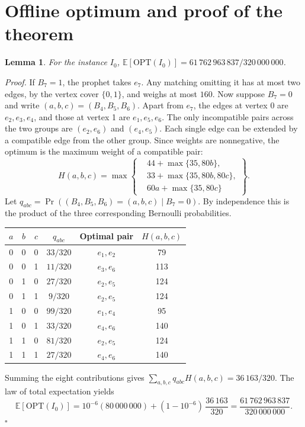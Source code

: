 \documentclass[11pt,a4paper]{article}
\newcommand{\E}{\mathbb{E}}
\newcommand{\OPT}{\mathrm{OPT}}
\newcommand{\numoff}{61\,762\,963\,837}
\newcommand{\masa}{320\,000\,000}
\newtheorem{lema}{Lemma}
\newenvironment{prueba}[1][Proof]{\par\smallskip\noindent\textit{#1.}\enspace}{\unskip\nobreak\hfill\(\square\)\par\smallskip}
\begin{document}
\clearpage
\section{Offline optimum and proof of the theorem}
\begin{lema}\label{lem:off}
For the instance \(I_0\), \(\E[\OPT(I_0)]=\numoff/\masa\).
\end{lema}
\begin{prueba}
If \(B_7=1\), the prophet takes \(e_7\). Any matching omitting it has at most two edges, by the vertex cover \(\{0,1\}\), and weighs at most \(160\). Now suppose \(B_7=0\) and write \((a,b,c)=(B_4,B_5,B_6)\). Apart from \(e_7\), the edges at vertex 0 are \(e_2,e_3,e_4\), and those at vertex 1 are \(e_1,e_5,e_6\). The only incompatible pairs across the two groups are \((e_2,e_6)\) and \((e_4,e_5)\). Each single edge can be extended by a compatible edge from the other group. Since weights are nonnegative, the optimum is the maximum weight of a compatible pair:
\[
 H(a,b,c)=\max\left\{
 \begin{aligned}
 &44+\max\{35,80b\},\\
 &33+\max\{35,80b,80c\},\\
 &60a+\max\{35,80c\}
 \end{aligned}\right\}.
\]
Let \(q_{abc}=\Pr((B_4,B_5,B_6)=(a,b,c)\mid B_7=0)\). By independence this is the product of the three corresponding Bernoulli probabilities.
\begin{center}\renewcommand{\arraystretch}{1.14}
\begin{tabular}{@{}ccc@{\qquad}ccc@{}}\toprule
\(a\)&\(b\)&\(c\)&\(q_{abc}\)& Optimal pair & \(H(a,b,c)\)\\\midrule
0&0&0&\(33/320\)&\(e_1,e_2\)&79\\
0&0&1&\(11/320\)&\(e_3,e_6\)&113\\
0&1&0&\(27/320\)&\(e_2,e_5\)&124\\
0&1&1&\(9/320\)&\(e_2,e_5\)&124\\
1&0&0&\(99/320\)&\(e_1,e_4\)&95\\
1&0&1&\(33/320\)&\(e_4,e_6\)&140\\
1&1&0&\(81/320\)&\(e_2,e_5\)&124\\
1&1&1&\(27/320\)&\(e_4,e_6\)&140\\\bottomrule
\end{tabular}\end{center}


Summing the eight contributions gives
\(\sum_{a,b,c}q_{abc}H(a,b,c)=36\,163/320\). The law of total expectation yields
\[
 \E[\OPT(I_0)]
   =10^{-6}(80\,000\,000)+(1-10^{-6})\,\frac{36\,163}{320}
   =\frac{\numoff}{\masa}.
\]
\end{prueba}
\end{document}
